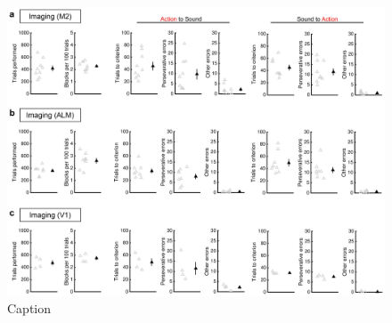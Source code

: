 \begin{figure}[htbp]

\begin{center}
\includegraphics[width=\textwidth]{Figures/NN_figS1.jpg} 
\end{center}

\caption[Summary of behavioral performance for mice in imaging experiments]
{Caption}

\label{fig:NN_figS1}
\end{figure}